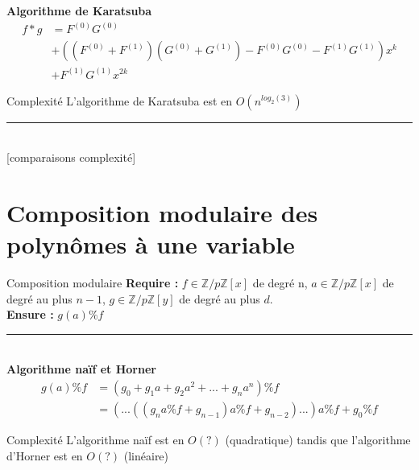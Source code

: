 \documentclass[10pt,a4paper]{beamer}
\begin{document}
\begin{frame}
    \textbf{Algorithme de Karatsuba}
    \begin{align*}
        f*g &= F^{(0)}G^{(0)}\\
            &+\left((F^{(0)}+F^{(1)}) (G^{(0)} + G^{(1)}) - F^{(0)}G^{(0)} - F^{(1)}G^{(1)}\right)x^k\\
            &+F^{(1)}G^{(1)}x^{2k} 
    \end{align*}

    \begin{alertblock}{Complexité}
        L'algorithme de Karatsuba est en $O(n^{log_2(3)})$
    \end{alertblock}
    \rule{\linewidth}{0.2mm}\\[0.5cm]
    [comparaisons complexité]
    
\end{frame}


\section{Composition modulaire des polynômes à une variable}
\begin{frame}
    \tableofcontents[currentsection]
\end{frame}

\begin{frame}
    \begin{block}{Composition modulaire}
        \textbf{Require :} $f \in \mathbb{Z}/p\mathbb{Z}[x]$ de degré n, $a \in \mathbb{Z}/p\mathbb{Z}[x]$ de degré au plus $n-1$, $g \in \mathbb{Z}/p\mathbb{Z}[y]$ de degré au plus $d$. \\
        \textbf{Ensure :} $g(a) \% f$
    \end{block}
    \rule{\linewidth}{0.2mm}\\[0.5cm]
    
    \textbf{Algorithme naïf et Horner}
    \begin{align*}
        g(a)\%f &=(g_0+g_1a+g_2a^2+...+g_na^n) \%f \\
            &=(...((g_{n}a \%f +g_{n-1})a \%f+g_{n-2})...)a \%f+g_0 \%f    
    \end{align*}

    \begin{alertblock}{Complexité}
        L'algorithme naïf est en $O(?)$ (quadratique) tandis que l'algorithme d'Horner est en $O(?)$ (linéaire)
    \end{alertblock}
\end{frame}
\end{document}
